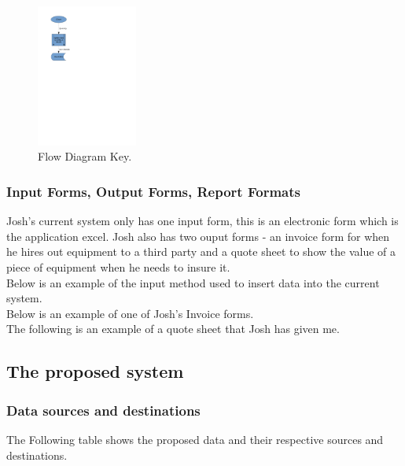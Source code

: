 \documentclass[a4paper,12pt]{report}
\begin{document}
\begin{figure}[H]
    \caption{Flow Diagram Key.} \label{fig:print_function_result}
    \centerline{\includegraphics[width=125px]{./Dataflow/DFD_analysis_update_item.pdf}}
\end{figure}

\newpage

\subsubsection{Input Forms, Output Forms, Report Formats}

Josh's current system only has one input form, this is an electronic form which is the application excel. Josh also has two ouput forms - an invoice form for when he hires out equipment to a third party and a quote sheet to show the value of a piece of equipment when he needs to insure it.\\

\noindent Below is an example of the input method used to insert data into the current system.\\

\noindent Below is an example of one of Josh's Invoice forms.\\

\noindent The following is an example of a quote sheet that Josh has given me.\\

\newpage

\subsection{The proposed system}

\subsubsection{Data sources and destinations}

The Following table shows the proposed data and their respective sources and destinations.
\end{document}
